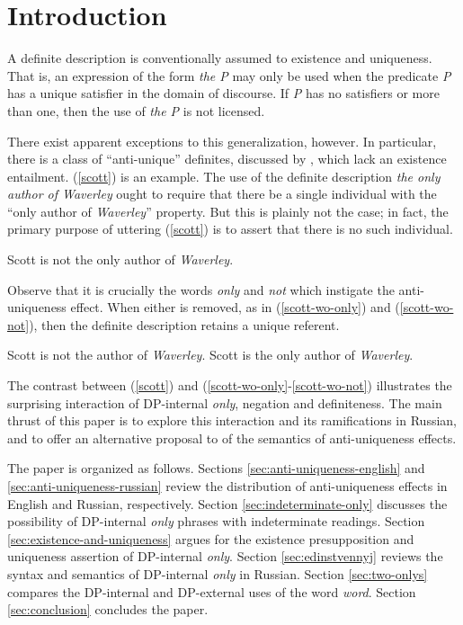 \section{Introduction \label{sec:intro}}
A definite description is conventionally assumed to existence and uniqueness. That is, an expression of the form \textit{the P} may only be used when the predicate \textit{P} has a unique satisfier in the domain of discourse. If \textit{P} has no satisfiers or more than one, then the use of \textit{the P} is not licensed.

There exist apparent exceptions to this generalization, however. In particular, there is a class of ``anti-unique'' definites, discussed by \citet{cb2015}, which lack an existence entailment. (\ref{scott}) is an example. The use of the definite description \textit{the only author of Waverley} ought to require that there be a single individual with the ``only author of \textit{Waverley}'' property. But this is plainly not the case; in fact, the primary purpose of uttering (\ref{scott}) is to assert that there is no such individual.

\begin{exe}
	\ex \label{scott} Scott is not the only author of \textit{Waverley}.
\end{exe}

Observe that it is crucially the words \textit{only} and \textit{not} which instigate the anti-uniqueness effect. When either is removed, as in (\ref{scott-wo-only}) and (\ref{scott-wo-not}), then the definite description retains a unique referent.

\begin{exe}
	\ex \label{scott-wo-only} Scott is not the author of \textit{Waverley}.
	\ex \label{scott-wo-not} Scott is the only author of \textit{Waverley}.
\end{exe}

The contrast between (\ref{scott}) and (\ref{scott-wo-only}-\ref{scott-wo-not}) illustrates the surprising interaction of DP-internal \textit{only}, negation and definiteness. The main thrust of this paper is to explore this interaction and its ramifications in Russian, and to offer an alternative proposal to  of the semantics of anti-uniqueness effects.

The paper is organized as follows. Sections \ref{sec:anti-uniqueness-english} and \ref{sec:anti-uniqueness-russian} review the distribution of anti-uniqueness effects in English and Russian, respectively. Section \ref{sec:indeterminate-only} discusses the possibility of DP-internal \textit{only} phrases with indeterminate readings. Section \ref{sec:existence-and-uniqueness} argues for the existence presupposition and uniqueness assertion of DP-internal \textit{only}. Section \ref{sec:edinstvennyj} reviews the syntax and semantics of DP-internal \textit{only} in Russian. Section \ref{sec:two-onlys} compares the DP-internal and DP-external uses of the word \textit{word}. Section \ref{sec:conclusion} concludes the paper.